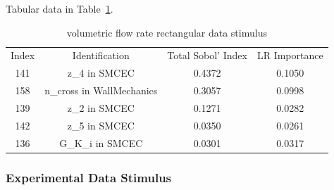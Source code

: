 \documentclass[12pt]{article}
\numberwithin{equation}{section}
\begin{document}
Tabular data in Table~\ref{qoi_vol_flow_rec}.

\begin{table}[h]
\centering
\begin{tabular}{cccc}
Index & Identification & Total Sobol' Index & LR Importance \\
141 &  z\_4 in SMCEC &  0.4372 & 0.1050\\
158 & n\_cross in WallMechanics & 0.3057 & 0.0998\\
 139 & z\_2 in SMCEC & 0.1271 & 0.0282\\
 142 & z\_5 in SMCEC & 0.0350 & 0.0261\\
  136 & G\_K\_i in SMCEC & 0.0301 & 0.0317\\
\end{tabular}
\caption{volumetric flow rate rectangular data stimulus}
\label{qoi_vol_flow_rec}
\end{table}

\newpage

\subsubsection{Experimental Data Stimulus}
\end{document}
